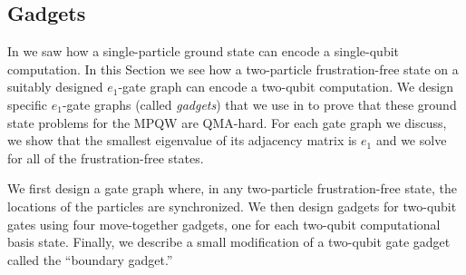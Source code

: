 \documentclass[../thesis-main/thesis-main]{subfiles}
\begin{document}
%
%


\subsection{Gadgets}\label{sec:gadgets}


In  we saw how a single-particle ground state can encode a single-qubit computation. In this Section we see how a two-particle frustration-free state on a suitably designed $e_{1}$-gate graph can encode a two-qubit computation. We design specific $e_{1}$-gate graphs (called \emph{gadgets}) that we use in  to prove that these ground state problems for the MPQW are QMA-hard. For each gate graph we discuss, we show that the smallest eigenvalue of its adjacency matrix is $e_{1}$ and we solve for all of the frustration-free states.

We first design a gate graph where, in any two-particle frustration-free state, the locations of the particles are synchronized.  We then design gadgets for two-qubit gates using four move-together gadgets, one for each two-qubit computational basis state. Finally, we describe a small modification of a two-qubit gate gadget called the ``boundary gadget.''
\end{document}
